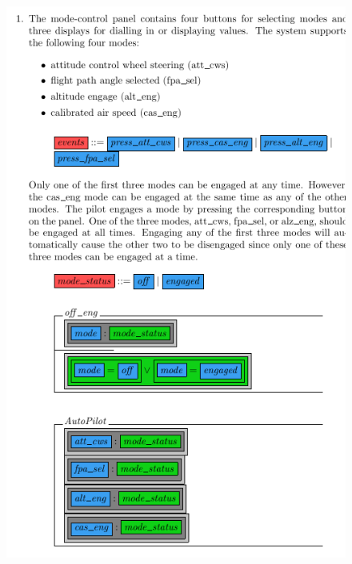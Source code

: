 \begin{figure}[H]
     \centering
     \begin{minipage}{0.45\textwidth}
     \centering
     \includegraphics[width=\linewidth]{Figures/fullexample/semiform1a.png}
     \end{minipage}\hfill
     \begin{minipage}{0.45\textwidth}
     \centering

\end{minipage}
\end{figure}
